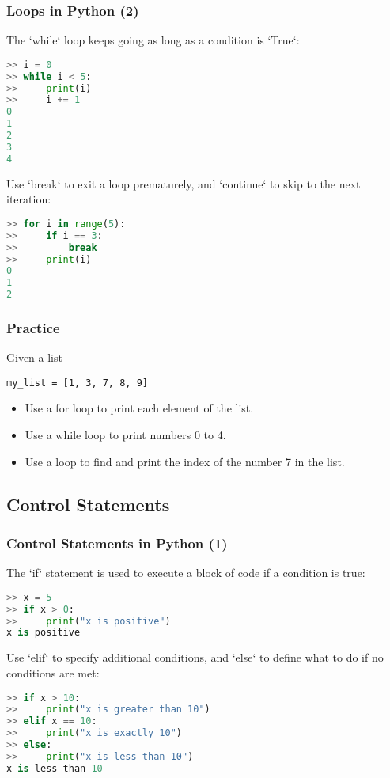 \begin{frame}[fragile]
  \frametitle{Loops in Python (2)}
  The `while` loop keeps going as long as a condition is `True`:
  \begin{lstlisting}[language=Python,numbers=none]
>> i = 0
>> while i < 5:
>>     print(i)
>>     i += 1
0
1
2
3
4
  \end{lstlisting}\pause
  Use `break` to exit a loop prematurely, and `continue` to skip to the next iteration:
  \begin{lstlisting}[language=Python,numbers=none]
>> for i in range(5):
>>     if i == 3:
>>         break
>>     print(i)
0
1
2
  \end{lstlisting}
\end{frame}

\begin{frame}[fragile]
 \frametitle{Practice}
 Given a list
 
 \lstinline$my_list = [1, 3, 7, 8, 9]$

 \begin{itemize}
  \item Use a for loop to print each element of the list.\pause
  \item Use a while loop to print numbers 0 to 4.\pause
  \item Use a loop to find and print the index of the number 7 in the list.
 \end{itemize}
\end{frame}

\subsection*{Control Statements}
\begin{frame}[fragile]
  \frametitle{Control Statements in Python (1)}
  The `if` statement is used to execute a block of code if a condition is true:
  \begin{lstlisting}[language=Python]
>> x = 5
>> if x > 0:
>>     print("x is positive")
x is positive
  \end{lstlisting}\pause
  Use `elif` to specify additional conditions, and `else` to define what to do if no conditions are met:
  \begin{lstlisting}[language=Python]
>> if x > 10:
>>     print("x is greater than 10")
>> elif x == 10:
>>     print("x is exactly 10")
>> else:
>>     print("x is less than 10")
x is less than 10
  \end{lstlisting}
\end{frame}

